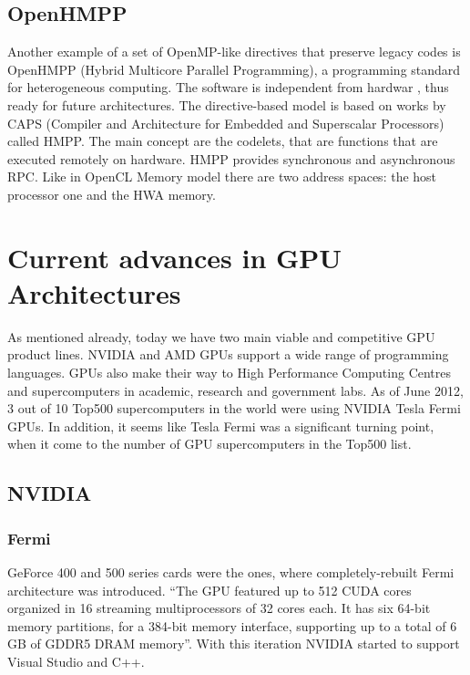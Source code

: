 \subsection{OpenHMPP}
Another example of a set of OpenMP-like directives that preserve legacy codes is OpenHMPP (Hybrid Multicore Parallel Programming), a programming standard for heterogeneous computing. The software is independent from hardwar , thus ready for future architectures. The directive-based model is based on works by CAPS (Compiler and Architecture for Embedded and Superscalar Processors) called HMPP. The main concept are the codelets, that are functions that are executed remotely on hardware. HMPP provides synchronous and asynchronous RPC. Like in OpenCL Memory model there are two address spaces: the host processor one and the HWA memory.


\section{Current advances in GPU Architectures}
As mentioned already, today we have two main viable and competitive GPU product lines. NVIDIA and AMD GPUs support a wide range of programming languages. GPUs also make their way to High Performance Computing Centres and supercomputers in academic, research and government labs. As of June 2012, 3 out of 10 Top500 supercomputers in the world were using NVIDIA Tesla Fermi GPUs. In addition, it seems like Tesla Fermi was a significant turning point, when it come to the number of GPU supercomputers in the Top500 list.


\subsection{NVIDIA}
\subsubsection{Fermi}
GeForce 400 and 500 series cards were the ones, where completely-rebuilt Fermi architecture was introduced. \enquote{The GPU featured up to 512 CUDA cores organized in 16 streaming multiprocessors of 32 cores each. It has six 64-bit memory partitions, for a 384-bit memory interface, supporting up to a total of 6 GB of GDDR5 DRAM
memory}. With this iteration NVIDIA started to support Visual Studio and C++.

